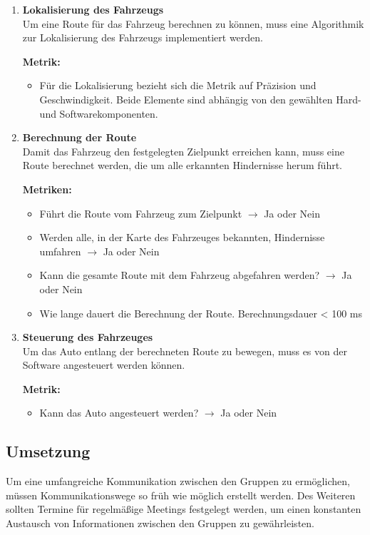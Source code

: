 \begin{enumerate}[leftmargin=*]
    \item \textbf{Lokalisierung des Fahrzeugs}\\
    Um eine Route für das Fahrzeug berechnen zu können, muss eine Algorithmik zur Lokalisierung des Fahrzeugs implementiert werden.

    \textbf{Metrik:} 
    \begin{itemize}
        \item Für die Lokalisierung bezieht sich die Metrik auf Präzision und Geschwindigkeit. 
    Beide Elemente sind abhängig von den gewählten Hard- und Softwarekomponenten. 
    \end{itemize}

    \item \textbf{Berechnung der Route}\\
    Damit das Fahrzeug den festgelegten Zielpunkt erreichen kann, muss eine Route berechnet werden, die um alle erkannten Hindernisse herum führt.
    
    \textbf{Metriken:}
    \begin{itemize}
        \item Führt die Route vom Fahrzeug zum Zielpunkt $\to$ Ja oder Nein
        \item Werden alle, in der Karte des Fahrzeuges bekannten, Hindernisse umfahren $\to$ Ja oder Nein
        \item Kann die gesamte Route mit dem Fahrzeug abgefahren werden? $\to$ Ja oder Nein
        \item Wie lange dauert die Berechnung der Route. Berechnungsdauer < 100 ms
    \end{itemize}

    \item \textbf{Steuerung des Fahrzeuges}\\
    Um das Auto entlang der berechneten Route zu bewegen, muss es von der Software angesteuert werden können.

    \textbf{Metrik:}
    \begin{itemize}
        \item Kann das Auto angesteuert werden? $\to$ Ja oder Nein
    \end{itemize}
\end{enumerate}

\subsection{Umsetzung}
Um eine umfangreiche Kommunikation zwischen den Gruppen zu ermöglichen, müssen Kommunikationswege so früh wie möglich erstellt werden.
Des Weiteren sollten Termine für regelmäßige Meetings festgelegt werden, um einen konstanten Austausch von Informationen zwischen den Gruppen zu gewährleisten.

